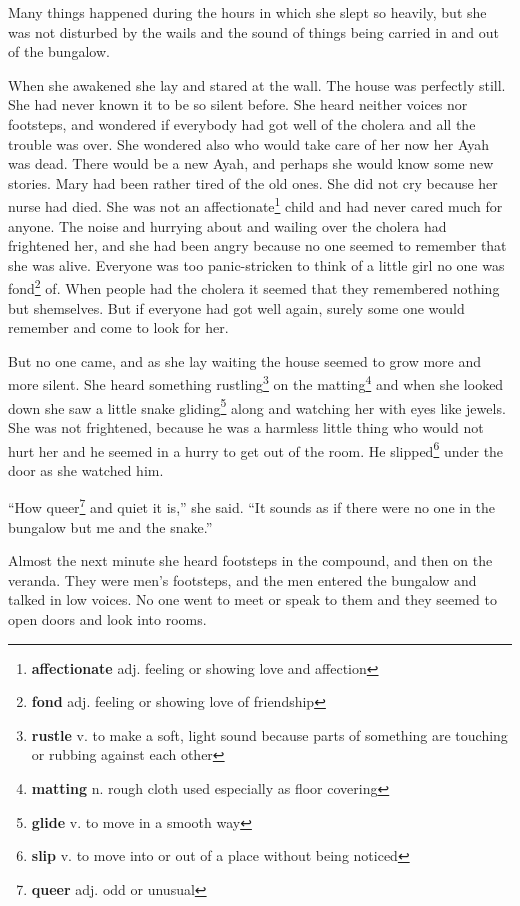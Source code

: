 Many things happened during the hours in which she slept so heavily, but she was not disturbed by the wails and the sound of things being carried in and out of the bungalow.

When she awakened she lay and stared at the wall. The house was perfectly still. She had never known it to be so silent before. She heard neither voices nor footsteps, and wondered if everybody had got well of the cholera and all the trouble was over. She wondered also who would take care of her now her Ayah was dead. There would be a new Ayah, and perhaps she would know some new stories. Mary had been rather tired of the old ones. She did not cry because her nurse had died. She was not an affectionate\footnote{\textbf{affectionate} adj. feeling or showing love and affection} child and had never cared much for anyone. The noise and hurrying about and wailing over the cholera had frightened her, and she had been angry because no one seemed to remember that she was alive. Everyone was too panic-stricken to think of a little girl no one was fond\footnote{\textbf{fond} adj. feeling or showing love of friendship} of. When people had the cholera it seemed that they remembered nothing but shemselves. But if everyone had got well again, surely some one would remember and come to look for her.

But no one came, and as she lay waiting the house seemed to grow more and more silent. She heard something rustling\footnote{\textbf{rustle} v. to make a soft, light sound because parts of something are touching or rubbing against each other} on the matting\footnote{\textbf{matting} n. rough cloth used especially as floor covering} and when she looked down she saw a little snake gliding\footnote{\textbf{glide} v. to move in a smooth way} along and watching her with eyes like jewels. She was not frightened, because he was a harmless little thing who would not hurt her and he seemed in a hurry to get out of the room. He slipped\footnote{\textbf{slip} v. to move into or out of a place without being noticed} under the door as she watched him.

``How queer\footnote{\textbf{queer} adj. odd or unusual} and quiet it is,'' she said. ``It sounds as if there were no one in the bungalow but me and the snake.''

Almost the next minute she heard footsteps in the compound, and then on the veranda. They were men's footsteps, and the men entered the bungalow and talked in low voices. No one went to meet or speak to them and they seemed to open doors and look into rooms.

